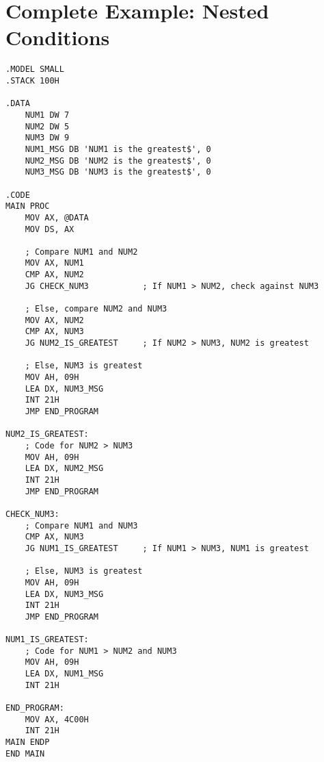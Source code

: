 \documentclass[a4paper,12pt]{article}
\begin{document}
\section{Complete Example: Nested Conditions}
\begin{verbatim}
.MODEL SMALL
.STACK 100H

.DATA
    NUM1 DW 7
    NUM2 DW 5
    NUM3 DW 9
    NUM1_MSG DB 'NUM1 is the greatest$', 0
    NUM2_MSG DB 'NUM2 is the greatest$', 0
    NUM3_MSG DB 'NUM3 is the greatest$', 0

.CODE
MAIN PROC
    MOV AX, @DATA
    MOV DS, AX

    ; Compare NUM1 and NUM2
    MOV AX, NUM1
    CMP AX, NUM2
    JG CHECK_NUM3           ; If NUM1 > NUM2, check against NUM3

    ; Else, compare NUM2 and NUM3
    MOV AX, NUM2
    CMP AX, NUM3
    JG NUM2_IS_GREATEST     ; If NUM2 > NUM3, NUM2 is greatest

    ; Else, NUM3 is greatest
    MOV AH, 09H
    LEA DX, NUM3_MSG
    INT 21H
    JMP END_PROGRAM

NUM2_IS_GREATEST:
    ; Code for NUM2 > NUM3
    MOV AH, 09H
    LEA DX, NUM2_MSG
    INT 21H
    JMP END_PROGRAM

CHECK_NUM3:
    ; Compare NUM1 and NUM3
    CMP AX, NUM3
    JG NUM1_IS_GREATEST     ; If NUM1 > NUM3, NUM1 is greatest

    ; Else, NUM3 is greatest
    MOV AH, 09H
    LEA DX, NUM3_MSG
    INT 21H
    JMP END_PROGRAM

NUM1_IS_GREATEST:
    ; Code for NUM1 > NUM2 and NUM3
    MOV AH, 09H
    LEA DX, NUM1_MSG
    INT 21H

END_PROGRAM:
    MOV AX, 4C00H
    INT 21H
MAIN ENDP
END MAIN
\end{verbatim}
\end{document}

